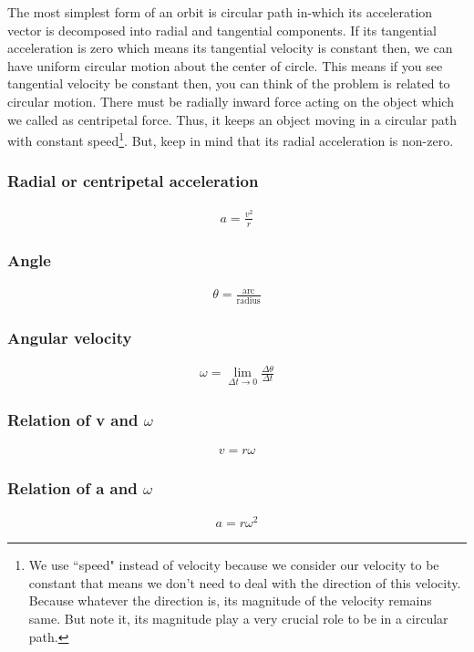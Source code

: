\documentclass[12pt,a4paper]{article}
\begin{document}
The most simplest form of an orbit is circular path in-which its acceleration vector is decomposed into radial and tangential components. If its tangential acceleration is zero which means its tangential velocity is constant then, we can have uniform circular motion about the center of circle.  This means if you see tangential velocity be constant then, you can think of the problem is related to circular motion. There must be radially inward force acting on the object which we called as centripetal force. Thus, it keeps an object moving in a circular path with constant speed\footnote{We use ``speed" instead of velocity because we consider our velocity to be constant that means we don't need to deal with the direction of this velocity. Because whatever the direction is, its magnitude of the velocity remains same. But note it, its magnitude play a very crucial role to be in a circular path.}. But, keep in mind that its radial acceleration is non-zero.

\subsubsection*{Radial or centripetal acceleration}
\begin{align*}
a = \frac{v^{2}}{r}
\end{align*}

\subsubsection*{Angle}
\begin{align*}
\theta = \frac{\text{arc}}{\text{radius}}
\end{align*}

\subsubsection*{Angular velocity}
\begin{align*}
\omega = \lim_{\Delta t \to 0}\frac{\Delta \theta}{\Delta t}
\end{align*}

\subsubsection*{Relation of v and $\omega$}
\begin{align}
v = r\omega
\end{align}

\subsubsection*{Relation of a and $\omega$}
\begin{align}
a = r\omega^{2}
\end{align}
\end{document}
